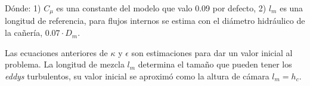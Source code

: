 Dónde: 1) $C_{\mu}$ es una constante del modelo que valo 0.09 por defecto, 2)
$l_{m}$ es una longitud de referencia, para flujos internos se estima con el
diámetro hidráulico de la cañería, $0.07\cdot D_{m}$.







Las ecuaciones anteriores de  $\kappa$ y $\epsilon$ son estimaciones para dar un
valor inicial al problema.
%
La longitud de mezcla $l_m$ determina el tamaño que pueden tener los
\emph{eddys} turbulentos, su valor inicial se aproximó como la altura de cámara
$l_m = h_c$.

